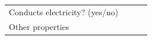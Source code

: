 \begin{enumerate}[noitemsep, label=\textbf{\arabic*}. ]
{\begin{tabular}[t]{|l|l|l|l|}
    
        Conducts electricity? (yes/no) &
    
    
         &
    
    
         &
    
    
     \tabularnewline\cline{1-1}\cline{2-2}\cline{3-3}\cline{4-4}
    
    
        Other properties &
    
    
         &
    
    
         &
    
    
     \tabularnewline\cline{1-1}\cline{2-2}\cline{3-3}\cline{4-4}
    \end{tabular}} %
      \addtocounter{footnote}{-0}
      

\end{enumerate}
